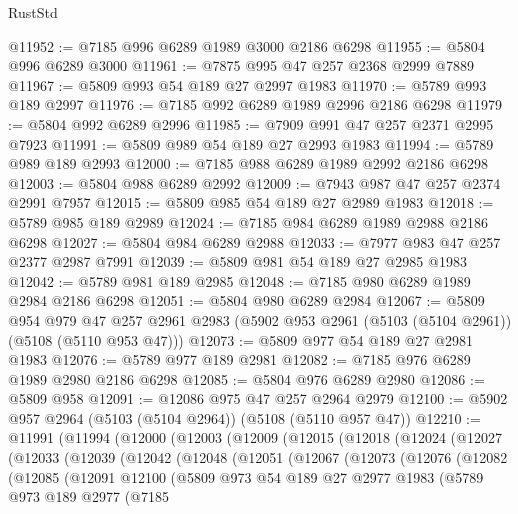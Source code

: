 \begin{lexlean}{RustStd}
\begin{coremodule}
@11952 := @7185 @996 @6289 @1989 @3000 @2186 @6298
@11955 := @5804 @996 @6289 @3000
@11961 := @7875 @995 @47 @257 @2368 @2999 @7889
@11967 := @5809 @993 @54 @189 @27 @2997 @1983
@11970 := @5789 @993 @189 @2997
@11976 := @7185 @992 @6289 @1989 @2996 @2186 @6298
@11979 := @5804 @992 @6289 @2996
@11985 := @7909 @991 @47 @257 @2371 @2995 @7923
@11991 := @5809 @989 @54 @189 @27 @2993 @1983
@11994 := @5789 @989 @189 @2993
@12000 := @7185 @988 @6289 @1989 @2992 @2186 @6298
@12003 := @5804 @988 @6289 @2992
@12009 := @7943 @987 @47 @257 @2374 @2991 @7957
@12015 := @5809 @985 @54 @189 @27 @2989 @1983
@12018 := @5789 @985 @189 @2989
@12024 := @7185 @984 @6289 @1989 @2988 @2186 @6298
@12027 := @5804 @984 @6289 @2988
@12033 := @7977 @983 @47 @257 @2377 @2987 @7991
@12039 := @5809 @981 @54 @189 @27 @2985 @1983
@12042 := @5789 @981 @189 @2985
@12048 := @7185 @980 @6289 @1989 @2984 @2186 @6298
@12051 := @5804 @980 @6289 @2984
@12067 := @5809
    @954
    @979
    @47
    @257
    @2961
    @2983
    (@5902 @953 @2961 (@5103 (@5104 @2961)) (@5108 (@5110 @953 @47)))
@12073 := @5809 @977 @54 @189 @27 @2981 @1983
@12076 := @5789 @977 @189 @2981
@12082 := @7185 @976 @6289 @1989 @2980 @2186 @6298
@12085 := @5804 @976 @6289 @2980
@12086 := @5809 @958
@12091 := @12086 @975 @47 @257 @2964 @2979
@12100 := @5902 @957 @2964 (@5103 (@5104 @2964)) (@5108 (@5110 @957 @47))
@12210 := @11991
    (@11994
      (@12000
        (@12003
          (@12009
            (@12015
              (@12018
                (@12024
                  (@12027
                    (@12033
                      (@12039
                        (@12042
                          (@12048
                            (@12051
                              (@12067
                                (@12073
                                  (@12076
                                    (@12082
                                      (@12085
                                        (@12091
                                          @12100
                                          (@5809
                                            @973
                                            @54
                                            @189
                                            @27
                                            @2977
                                            @1983
                                            (@5789
                                              @973
                                              @189
                                              @2977
                                              (@7185

\end{coremodule}
\end{lexlean}

